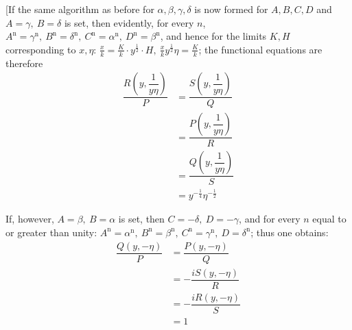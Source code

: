 \begingroup
\renewcommand{\arraystretch}{1.45}
[If the same algorithm as before for $\alpha,\allowbreak \beta,\allowbreak \gamma,\allowbreak \delta$ is now formed for $A,\allowbreak B,\allowbreak C,\allowbreak D$ and $A=\gamma,\allowbreak \ B=\delta$ is set, then evidently, for every $n$, $A^{\mathrm n}=\gamma^{\mathrm n},\allowbreak \ B^{\mathrm n}=\delta^{\mathrm n},\allowbreak \ C^{\mathrm n}=\alpha^{\mathrm n},\allowbreak \ D^{\mathrm n}=\beta^{\mathrm n}$, and hence for the limits $K,\allowbreak H$ corresponding to
$x,\allowbreak \eta$: $\frac{x}k=\frac Kk\cdot y^{\frac12}\cdot H,\allowbreak \ \frac{x}k y^{\frac12}\eta=\frac Kk$; the functional equations are therefore
\[
\begin{aligned}\dfrac{R(y,\dfrac1{y\eta})}P
&=\dfrac{S(y,\dfrac1{y\eta})}Q
\\[7pt]&=\dfrac{P(y,\dfrac1{y\eta})}R
\\[7pt]&=\dfrac{Q(y,\dfrac1{y\eta})}S
\\[7pt]&=y^{-\frac14}\eta^{-\frac12}\end{aligned}
\]

If, however, $A=\beta,\allowbreak \ B=\alpha$ is set, then $C=-\delta,\allowbreak \ D=-\gamma$, and for every $n$ equal to or greater than unity: $A^{\mathrm n}=\alpha^{\mathrm n},\allowbreak \ B^{\mathrm n}=\beta^{\mathrm n},\allowbreak \ C^{\mathrm n}=\gamma^{\mathrm n},\allowbreak \ D=\delta^{\mathrm n}$; thus one obtains:
\[
\begin{aligned}\dfrac{Q(y,-\eta)}P
&=\dfrac{P(y,-\eta)}Q
\\[7pt]&=-\dfrac{iS(y,-\eta)}R
\\[7pt]&=-\dfrac{iR(y,-\eta)}S\\[7pt]&=1\end{aligned}
\]

